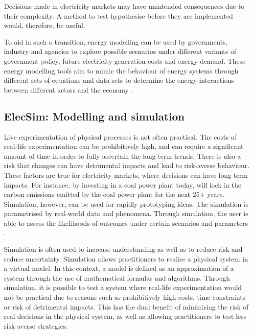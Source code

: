 Decisions made in electricity markets may have unintended consequences due to their complexity. A method to test hypothesise before they are implemented would, therefore, be useful.

To aid in such a transition, energy modelling can be used by governments, industry and agencies to explore possible scenarios under different variants of government policy, future electricity generation costs and energy demand. These energy modelling tools aim to mimic the behaviour of energy systems through different sets of equations and data sets to determine the energy interactions between different actors and the economy \cite{Machado2019}.





\subsection{ElecSim: Modelling and simulation}




Live experimentation of physical processes is not often practical. The costs of real-life experimentation can be prohibitively high, and can require a significant amount of time in order to fully ascertain the long-term trends. There is also a risk that changes can have detrimental impacts and lead to risk-averse behaviour. These factors are true for electricity markets, where decisions can have long term impacts. For instance, by investing in a coal power plant today, will lock in the carbon emissions emitted by the coal power plant for the next 25+ years. Simulation, however, can be used for rapidly prototyping ideas. The simulation is parametrised by real-world data and phenomena. Through simulation, the user is able to assess the likelihoods of outcomes under certain scenarios and parameters \cite{Law:603360}.





Simulation is often used to increase understanding as well as to reduce risk and reduce uncertainty. Simulation allows practitioners to realise a physical system in a virtual model. In this context, a model is defined as an approximation of a system through the use of mathematical formulas and algorithms. Through simulation, it is possible to test a system where real-life experimentation would not be practical due to reasons such as prohibitively high costs, time constraints or risk of detrimental impacts. This has the dual benefit of minimising the risk of real decisions in the physical system, as well as allowing practitioners to test less risk-averse strategies.


